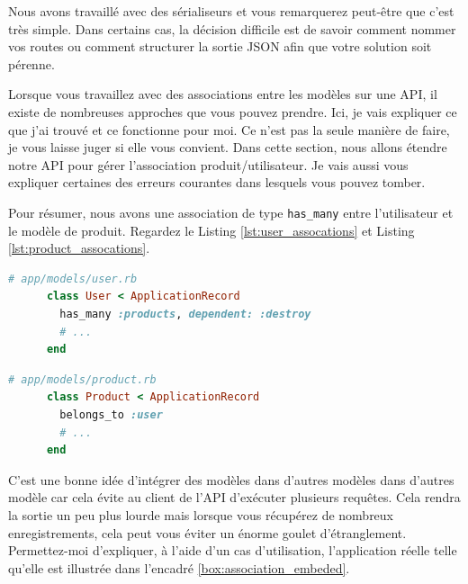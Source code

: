 \documentclass[]{report}
\begin{document}
    Nous avons travaillé avec des sérialiseurs et vous remarquerez peut-être que c'est très simple. Dans certains cas, la décision difficile est de savoir comment nommer vos routes ou comment structurer la sortie JSON afin que votre solution soit pérenne.

    Lorsque vous travaillez avec des associations entre les modèles sur une API, il existe de nombreuses approches que vous pouvez prendre. Ici, je vais expliquer ce que j'ai trouvé et ce fonctionne pour moi. Ce n'est pas la seule manière de faire, je vous laisse juger si elle vous convient. Dans cette section, nous allons étendre notre API pour gérer l'association produit/utilisateur. Je vais aussi vous expliquer certaines des erreurs courantes dans lesquels vous pouvez tomber.

    Pour résumer, nous avons une association de type \verb|has_many| entre l'utilisateur et le modèle de produit. Regardez le Listing \ref{lst:user_assocations} et Listing \ref{lst:product_assocations}.

    \begin{scriptsize}
      \begin{lstlisting}[language=ruby, caption={Associations des utilisateurs}, label={lst:user_assocations}]
      # app/models/user.rb
      class User < ApplicationRecord
        has_many :products, dependent: :destroy
        # ...
      end
      \end{lstlisting}
    \end{scriptsize}

    \begin{scriptsize}
      \begin{lstlisting}[language=ruby, caption={Associations des produits}, label={lst:product_assocations}]
      # app/models/product.rb
      class Product < ApplicationRecord
        belongs_to :user
        # ...
      end
      \end{lstlisting}
    \end{scriptsize}

    C'est une bonne idée d'intégrer des modèles dans d'autres modèles dans d'autres modèle car cela évite au client de l'API d’exécuter plusieurs requêtes. Cela rendra la sortie un peu plus lourde mais lorsque vous récupérez de nombreux enregistrements, cela peut vous éviter un énorme goulet d'étranglement. Permettez-moi d'expliquer, à l'aide d'un cas d'utilisation, l'application réelle telle qu'elle est illustrée dans l'encadré \ref{box:association_embeded}.
\end{document}

